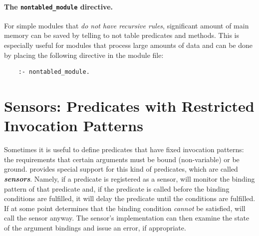 \documentclass[11pt]{article}
\newcommand{\ERGO}{\mbox{\smaller{\ensuremath{\cal{E}}\smaller{{\sc{RGO}}}}}\xspace}
\newcommand{\FLSYSTEM}{\ERGO}
\begin{document}
\paragraph{The \texttt{nontabled\_module}  directive.}
For simple modules that \emph{do not have recursive rules}, significant
amount of main memory can be saved by telling \FLSYSTEM to not table
predicates and methods.  This is especially useful for modules that process
large amounts of data and can be done by placing the following directive
in the module file:
\begin{verbatim}
    :- nontabled_module.
\end{verbatim}


\section{Sensors: Predicates with Restricted Invocation Patterns}\label{sec-sensor}

Sometimes it is useful to define predicates that have fixed
invocation patterns: the requirements that certain arguments must be
bound (non-variable) or be ground.
\FLSYSTEM provides special support for this kind of predicates, which are
called \textbf{\emph{sensors}}. Namely, if a predicate is registered as a
sensor,
\FLSYSTEM will monitor the binding pattern of that predicate and, if the
predicate is called before the binding conditions are fulfilled, it will
delay the predicate until the conditions
are fulfilled. If  at some point \FLSYSTEM determines that
the binding condition \emph{cannot} be satisfied, \FLSYSTEM will call the sensor
anyway. The sensor's implementation
can then examine the state of the argument bindings and
issue an error, if appropriate.
\end{document}
